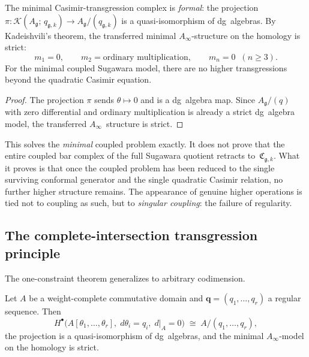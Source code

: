 \begin{theorem}
\label{thm:casimir-quadric-rigidity}
The minimal Casimir-transgression complex is \emph{formal}: the
projection
$\pi \colon \mathcal{K}(A_\mathfrak{g};\,q_{\mathfrak{g},k})
\to A_\mathfrak{g}/(q_{\mathfrak{g},k})$
is a quasi-isomorphism of dg~algebras. By
Kadeishvili's theorem, the transferred minimal $A_\infty$-structure
on the homology is strict:
\[
m_1 = 0,
\qquad
m_2 = \text{ordinary multiplication},
\qquad
m_n = 0 \;\;(n \geq 3).
\]
For the minimal coupled Sugawara model, there are no higher
transgressions beyond the quadratic Casimir equation.
\end{theorem}

\begin{proof}
The projection $\pi$ sends $\theta \mapsto 0$ and is a dg~algebra
map. Since $A_\mathfrak{g}/(q)$ with
zero differential and ordinary multiplication is already a strict
dg~algebra model, the transferred $A_\infty$~structure is strict.
\end{proof}

\begin{remark}
\label{rem:casimir-what-proved}
This solves the \emph{minimal} coupled problem exactly. It does
not prove that the entire coupled bar complex of the full Sugawara
quotient retracts to~$\mathfrak{C}_{\mathfrak{g},k}$. What it
proves is that once the coupled problem has been reduced to the
single surviving conformal generator and the single quadratic
Casimir relation, no further higher structure remains. The
appearance of genuine higher operations is tied not to coupling as
such, but to \emph{singular coupling}: the failure of regularity.
\end{remark}

\subsection{The complete-intersection transgression principle}
\label{subsec:ci-transgression}

The one-constraint theorem generalizes to arbitrary
codimension.

\begin{theorem}
\label{thm:ci-transgression-principle}
Let $A$ be a weight-complete commutative domain and
$\mathbf{q} = (q_1, \ldots, q_r)$ a regular sequence. Then
\[
H^\bullet\!\bigl(
 A[\theta_1, \ldots, \theta_r],\;
 d\theta_i = q_i,\;
 d|_A = 0
\bigr)
\;\cong\;
A/(q_1, \ldots, q_r),
\]
the projection is a quasi-isomorphism of dg~algebras, and the
minimal $A_\infty$-model on the homology is strict.
\end{theorem}

